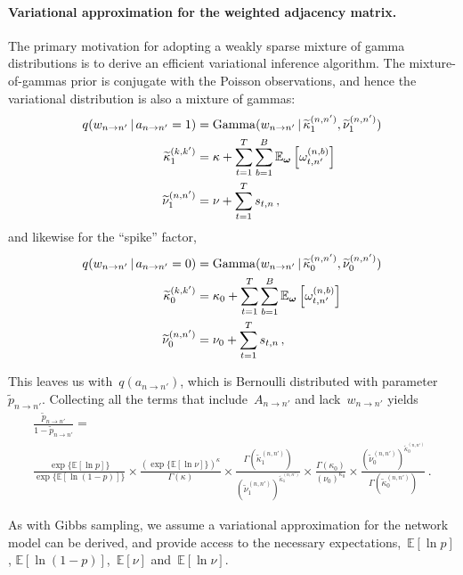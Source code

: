 \paragraph{Variational approximation for the weighted adjacency matrix.}
The primary motivation for adopting a weakly sparse mixture of gamma
distributions is to derive an efficient variational inference
algorithm.  The mixture-of-gammas prior is conjugate with the Poisson
observations, and hence the variational distribution is also a mixture
of gammas:
\begin{align*}
  q(w_{n \to n'} \,|\, a_{n \to n'}=1)
  &= \mathrm{Gamma}(w_{n \to n'} \,|\,
  \widetilde{\kappa}^{(n,n')}_1,
  \widetilde{\nu}^{(n,n')}_1) \\
  \widetilde{\kappa}^{(k,k')}_1
  &= \kappa + \sum_{t=1}^T \sum_{b=1}^B \mathbb{E}_{\boldsymbol{\omega}}\left[\omega_{t,n'}^{(n,b)}\right] \\
  \widetilde{\nu}^{(n,n')}_1
  &= \nu + \sum_{t=1}^T s_{t,n}\,,
\end{align*}
and likewise for the ``spike'' factor,
\begin{align*}
  q(w_{n \to n'} \,|\, a_{n \to n'}=0)
  &= \mathrm{Gamma}(w_{n \to n'} \,|\,
  \widetilde{\kappa}^{(n,n')}_0,
  \widetilde{\nu}^{(n,n')}_0) \\
  \widetilde{\kappa}^{(k,k')}_0
  &= \kappa_0 + \sum_{t=1}^T \sum_{b=1}^B \mathbb{E}_{\boldsymbol{\omega}}\left[\omega_{t,n'}^{(n,b)}\right] \\
  \widetilde{\nu}^{(n,n')}_0
  &= \nu_0 + \sum_{t=1}^T s_{t,n}\,,
\end{align*}

This leaves us with~$q(a_{n \to n'})$, which is Bernoulli distributed
with parameter~$\widetilde{p}_{n \to n'}$.  Collecting all the terms
that include~$A_{n \to n'}$ and lack~$w_{n \to n'}$ yields
\begin{multline*}
 \frac{\widetilde{p}_{n \to n'}}{1-\widetilde{p}_{n \to n'}} =  \\
 \frac{\exp\{\mathbb{E} [\ln p] \} }{\exp\{\mathbb{E}[\ln (1-p)] \}} \times 
\frac{ (\exp\{\mathbb{E} [\ln \nu] \})^{\kappa} }{ \Gamma(\kappa)} \times 
\frac{\Gamma(\widetilde{\kappa}^{(n,n')}_1)}{ (\widetilde{\nu}^{(n,n')}_1)^{\widetilde{\kappa}^{(n,n')}_1} } \times
\frac{\Gamma(\kappa_0)}{ (\nu_0)^{\kappa_0} } \times
\frac{(\widetilde{\nu}^{(n,n')}_0)^{\widetilde{\kappa}^{(n,n')}_0}}{ \Gamma(\widetilde{\kappa}^{(n,n')}_0)}\,.
\end{multline*}

As with Gibbs sampling, we assume a variational approximation for the network model can be derived, and provide access to the necessary expectations,~$\mathbb{E}[\ln p]$, $\mathbb{E}[\ln(1-p)]$,~$\mathbb{E}[\nu]$ and~$\mathbb{E}[\ln \nu]$. 

